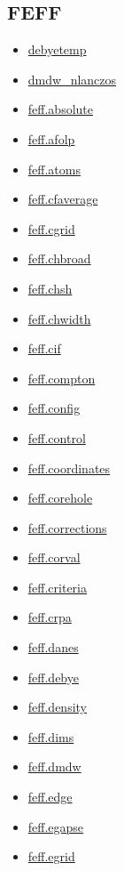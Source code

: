 \documentclass[11pt]{article}
\begin{document}
\subsection*{FEFF}
\begin{itemize}
\item \hyperref[kw:debyetemp]{debyetemp}
\item \hyperref[kw:dmdw-nlanczos]{dmdw\_nlanczos}
\item \hyperref[kw:feff-absolute]{feff.absolute}
\item \hyperref[kw:feff-afolp]{feff.afolp}
\item \hyperref[kw:feff-atoms]{feff.atoms}
\item \hyperref[kw:feff-cfaverage]{feff.cfaverage}
\item \hyperref[kw:feff-cgrid]{feff.cgrid}
\item \hyperref[kw:feff-chbroad]{feff.chbroad}
\item \hyperref[kw:feff-chsh]{feff.chsh}
\item \hyperref[kw:feff-chwidth]{feff.chwidth}
\item \hyperref[kw:feff-cif]{feff.cif}
\item \hyperref[kw:feff-compton]{feff.compton}
\item \hyperref[kw:feff-config]{feff.config}
\item \hyperref[kw:feff-control]{feff.control}
\item \hyperref[kw:feff-coordinates]{feff.coordinates}
\item \hyperref[kw:feff-corehole]{feff.corehole}
\item \hyperref[kw:feff-corrections]{feff.corrections}
\item \hyperref[kw:feff-corval]{feff.corval}
\item \hyperref[kw:feff-criteria]{feff.criteria}
\item \hyperref[kw:feff-crpa]{feff.crpa}
\item \hyperref[kw:feff-danes]{feff.danes}
\item \hyperref[kw:feff-debye]{feff.debye}
\item \hyperref[kw:feff-density]{feff.density}
\item \hyperref[kw:feff-dims]{feff.dims}
\item \hyperref[kw:feff-dmdw]{feff.dmdw}
\item \hyperref[kw:feff-edge]{feff.edge}
\item \hyperref[kw:feff-egapse]{feff.egapse}
\item \hyperref[kw:feff-egrid]{feff.egrid}

\end{itemize}
\end{document}
